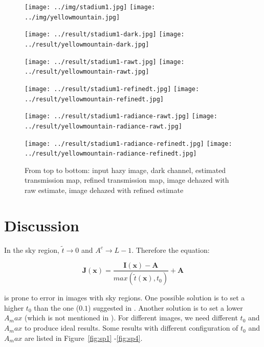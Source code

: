 \documentclass{article}
\begin{document}
\begin{figure}[H]
    \centering
    \begin{minipage}[b]{\linewidth}
        \centering
        \texttt{[image: ../img/stadium1.jpg]}
        \texttt{[image: ../img/yellowmountain.jpg]}
    \end{minipage}
    \begin{minipage}[b]{\linewidth}
        \centering
        \texttt{[image: ../result/stadium1-dark.jpg]}
        \texttt{[image: ../result/yellowmountain-dark.jpg]}
    \end{minipage}
    \begin{minipage}[b]{\linewidth}
        \centering
        \texttt{[image: ../result/stadium1-rawt.jpg]}
        \texttt{[image: ../result/yellowmountain-rawt.jpg]}
    \end{minipage}
    \begin{minipage}[b]{\linewidth}
        \centering
        \texttt{[image: ../result/stadium1-refinedt.jpg]}
        \texttt{[image: ../result/yellowmountain-refinedt.jpg]}
    \end{minipage}
    \begin{minipage}[b]{\linewidth}
        \centering
        \texttt{[image: ../result/stadium1-radiance-rawt.jpg]}
        \texttt{[image: ../result/yellowmountain-radiance-rawt.jpg]}
    \end{minipage}
    \begin{minipage}[b]{\linewidth}
        \centering
        \texttt{[image: ../result/stadium1-radiance-refinedt.jpg]}
        \texttt{[image: ../result/yellowmountain-radiance-refinedt.jpg]}
    \end{minipage}
    \caption{From top to bottom: input hazy image, dark channel, estimated transmission map, refined transmission map, image dehazed with raw estimate, image dehazed with refined estimate}
    \label{fig:result4}
\end{figure}

\section{Discussion}

In the sky region, $\tilde{t} \to 0$ and $A^c \to L - 1$. Therefore the equation:

$$
\mathbf{J}(\mathbf{x}) = \frac{\mathbf{I}(\mathbf{x}) - \mathbf{A}}{max(\tilde{t}(\mathbf{x}),t_0)} + \mathbf{A}
$$

is prone to error in images with sky regions. One possible solution is to set a higher $t_0$ than the one ($0.1$) suggested in \cite{he2009single}. Another solution is to set a lower $A_max$ (which is not mentioned in \cite{he2009single}). For different images, we need different $t_0$ and $A_max$ to produce ideal results. Some results with different configuration of  $t_0$ and $A_max$ are listed in Figure~\ref{fig:sp1} -\ref{fig:sp4}.
\end{document}
